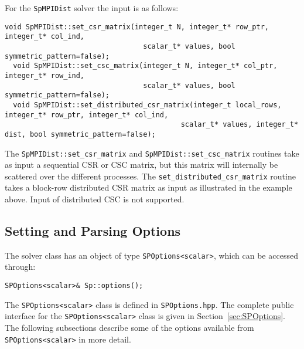 \documentclass{article}
\begin{document}
For the \lstinline[style=C]!SpMPIDist! solver the input is as follows:
\begin{lstlisting}[style=C]
  void SpMPIDist::set_csr_matrix(integer_t N, integer_t* row_ptr, integer_t* col_ind,
                                 scalar_t* values, bool symmetric_pattern=false);
  void SpMPIDist::set_csc_matrix(integer_t N, integer_t* col_ptr, integer_t* row_ind,
                                 scalar_t* values, bool symmetric_pattern=false);
  void SpMPIDist::set_distributed_csr_matrix(integer_t local_rows, integer_t* row_ptr, integer_t* col_ind,
                                          scalar_t* values, integer_t* dist, bool symmetric_pattern=false);
\end{lstlisting}
The \lstinline[style=C]!SpMPIDist::set_csr_matrix! and
\lstinline[style=C]!SpMPIDist::set_csc_matrix! routines take as input
a sequential CSR or CSC matrix, but this matrix will internally be
scattered over the different processes. The
\lstinline[style=C]!set_distributed_csr_matrix! routine
takes a block-row distributed CSR matrix as input as illustrated in
the example above. Input of distributed CSC is not supported.

\subsection{Setting and Parsing Options}
The solver class has an object of type
\lstinline[style=C]!SPOptions<scalar>!, which can be accessed through:
\begin{lstlisting}[style=C]
  SPOptions<scalar>& Sp::options();
\end{lstlisting}
The \lstinline[style=C]!SPOptions<scalar>! class is defined in
\lstinline[style=Bash]!SPOptions.hpp!. The complete public interface
for the \lstinline[style=C]!SPOptions<scalar>! class is given in
Section~\ref{sec:SPOptions}. The following subsections describe some
of the options available from \lstinline[style=C]!SPOptions<scalar>!
in more detail.

\end{document}
